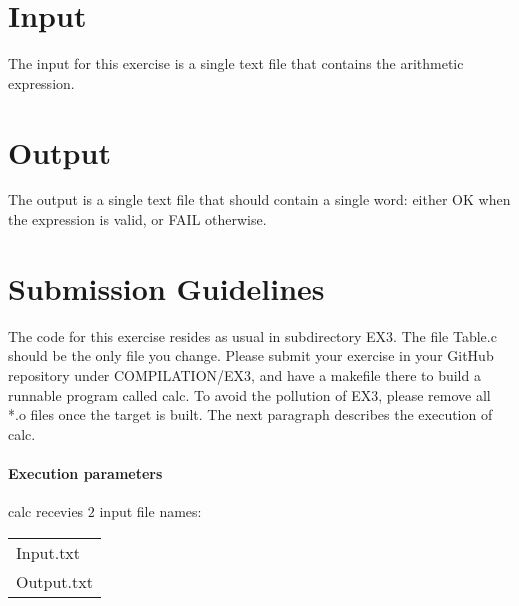 \documentclass{article}
\begin{document}
\section{Input}
The input for this exercise is a single text file that contains the arithmetic expression.

\section{Output}
The output is a single text file that should contain a single word:
either OK when the expression is valid, or FAIL otherwise. 

\section{Submission Guidelines}
The code for this exercise resides as usual in subdirectory EX3.
The file Table.c should be the only file you change.
Please submit your exercise in your GitHub repository under COMPILATION/EX3,
and have a makefile there to build a runnable program called calc.
To avoid the pollution of EX3, please remove all *.o files once the target is built.
The next paragraph describes the execution of calc.

\paragraph{Execution parameters}
calc recevies $2$ input file names:
\begin{table}[h]
\centering
\begin{tabular}{ l }
  Input.txt  \\
  Output.txt \\
\end{tabular}
\end{table}
\end{document}
